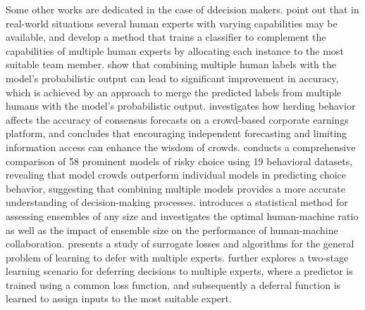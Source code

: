 Some other works are dedicated in the case of ddecision makers. \citet{Hemmer2022Forming} point out that in real-world situations several human experts with varying capabilities may be available, and develop a method that trains a classifier to complement the capabilities of multiple human experts by allocating each instance to the most suitable team member. \citet{Singh2023On} show that combining multiple human labels with the model's probabilistic output can lead to significant improvement in accuracy, which is achieved by an approach to merge the predicted labels from multiple humans with the model's probabilistic output. 
\citet{da2020harnessing} investigates how herding behavior affects the accuracy of consensus forecasts on a crowd-based corporate earnings platform, and concludes that encouraging independent forecasting and limiting information access can enhance the wisdom of crowds. \citet{he2022wisdom} conducts a comprehensive comparison of 58 prominent models of risky choice using 19 behavioral datasets, revealing that model crowds outperform individual models in predicting choice behavior, suggesting that combining multiple models provides a more accurate understanding of decision-making processes.
\citet{zou2024} introduces a
statistical method for assessing ensembles of any size and
investigates the optimal human-machine ratio as well as the
impact of ensemble size on the performance of human-machine
collaboration. \citet{Mao2023Principled} presents a study of surrogate losses and algorithms for the general problem of learning to defer with multiple experts.
\citet{mao2024two} further explores a two-stage learning scenario for deferring decisions to multiple experts, where a predictor is trained using a common loss function, and subsequently a deferral function is learned to assign inputs to the most suitable expert. 



